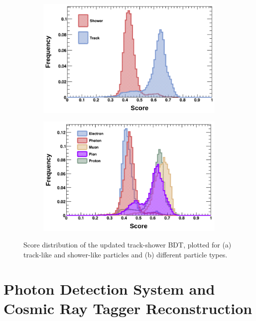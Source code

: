\begin{figure}[htbp!]
        \centering
        \begin{subfigure}[b]{0.495\textwidth}
            \centering
            \includegraphics[width=\textwidth]{bdt_score_trk_shw}
            \caption{}%
        \end{subfigure}
        \hfill
        \begin{subfigure}[b]{0.495\textwidth}  
            \centering 
            \includegraphics[width=\textwidth]{bdt_score_particle}
            \caption{}%
        \end{subfigure}
        \caption[Score Distributions of Updated Track-Shower Separation BDT]{
	Score distribution of the updated track-shower BDT, plotted for (a) track-like and shower-like particles and (b) different particle types.
	}
        \label{fig:bdt_score}
\end{figure}

\section{Photon Detection System and Cosmic Ray Tagger Reconstruction}
\label{sec:reco_others}

